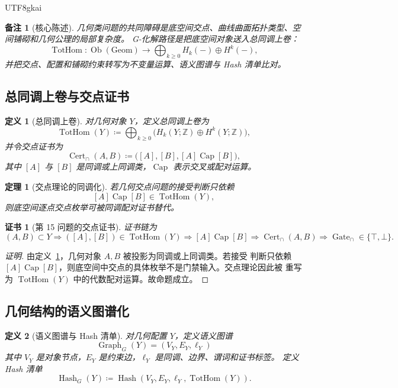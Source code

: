 \documentclass[12pt]{article}
\newtheorem{definition}{定义}[section]
\newtheorem{theorem}{定理}[section]
\newtheorem{remark}{备注}[section]
\newtheorem{Certificate}{证书}[section]
\newcommand{\ZZ}{\mathbb{Z}}
\newcommand{\DefEq}{\coloneqq}
\DeclareMathOperator{\Ob}{Ob}
\DeclareMathOperator{\Cert}{Cert}
\DeclareMathOperator{\Gate}{Gate}
\DeclareMathOperator{\TotHom}{TotHom}
\DeclareMathOperator{\GCap}{Cap}
\DeclareMathOperator{\Graph}{Graph}
\DeclareMathOperator{\Hash}{Hash}
\begin{document}
\begin{CJK*}{UTF8}{gkai}
\begin{remark}[核心陈述]
几何类问题的共同障碍是底空间交点、曲线曲面拓扑类型、空间铺砌和几何公理的局部复杂度。
G-化解路径是把底空间对象送入总同调上卷：
\[
  \TotHom:
  \Ob(\mathrm{Geom})
  \longrightarrow
  \bigoplus_{k\ge0}H_k(-)\oplus H^k(-),
\]
并把交点、配置和铺砌约束转写为不变量运算、语义图谱与 Hash 清单比对。
\end{remark}

\subsection{总同调上卷与交点证书}
\label{subsec:tex59-total-homology}

\begin{definition}[总同调上卷]
\label{def:tex59-total-homology}
对几何对象 \(Y\)，定义总同调上卷为
\[
  \TotHom(Y)
  \DefEq
  \bigoplus_{k\ge0}
  \bigl(H_k(Y;\ZZ)\oplus H^k(Y;\ZZ)\bigr),
\]
并令交点证书为
\[
  \Cert_{\cap}(A,B)
  \DefEq
  \bigl([A],[B],[A]\GCap[B]\bigr),
  \]
其中 \([A]\) 与 \([B]\) 是同调或上同调类，\(\GCap\) 表示交叉或配对运算。
\end{definition}

\begin{theorem}[交点理论的同调化]
\label{thm:tex59-intersection-homology}
若几何交点问题的接受判断只依赖
\[
  [A]\GCap[B]\in\TotHom(Y),
\]
则底空间逐点交点枚举可被同调配对证书替代。
\end{theorem}

\begin{Certificate}[第 15 问题的交点证书]
\label{cert:tex59-schubert}
证书链为
\[
  (A,B)\subset Y
  \Longrightarrow
  ([A],[B])\in\TotHom(Y)
  \Longrightarrow
  [A]\GCap[B]
  \Longrightarrow
  \Cert_{\cap}(A,B)
  \Longrightarrow
  \Gate_{\cap}\in\{\top,\bot\}.
\]
\end{Certificate}

\begin{proof}[证明]
由定义~\ref{def:tex59-total-homology}，几何对象 \(A,B\) 被投影为同调或上同调类。若接受
判断只依赖 \([A]\GCap[B]\)，则底空间中交点的具体枚举不是门禁输入。交点理论因此被
重写为 \(\TotHom(Y)\) 中的代数配对运算。故命题成立。
\end{proof}

\subsection{几何结构的语义图谱化}
\label{subsec:tex59-geometry-graph}

\begin{definition}[语义图谱与 Hash 清单]
\label{def:tex59-semantic-graph}
对几何配置 \(Y\)，定义语义图谱
\[
  \Graph_G(Y)=(V_Y,E_Y,\ell_Y)
\]
其中 \(V_Y\) 是对象节点，\(E_Y\) 是约束边，\(\ell_Y\) 是同调、边界、谓词和证书标签。
定义 Hash 清单
\[
  \Hash_G(Y)\DefEq \Hash(V_Y,E_Y,\ell_Y,\TotHom(Y)).
\]
\end{definition}


\end{CJK*}
\end{document}
